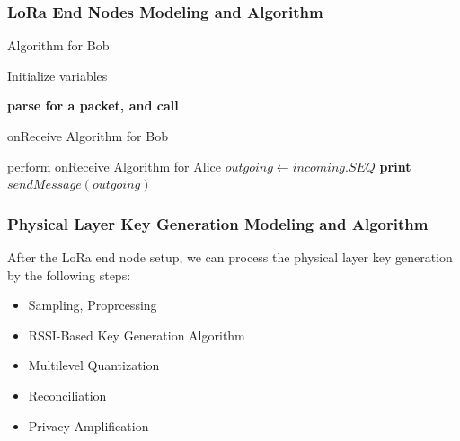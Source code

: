 \documentclass{beamer}
\begin{document}
\begin{frame}
  \frametitle{LoRa End Nodes Modeling and Algorithm}
  \begin{algorithm}[H]
    \caption{Algorithm for Bob}\label{alg:Bob}
    \begin{algorithmic}
    \State Initialize variables
        
            \State \textbf{parse for a packet, and call} 
        \EndFunction
    \end{algorithmic}
  \end{algorithm}
  \begin{algorithm}[H]
    \caption{onReceive Algorithm for Bob}\label{alg:BobonReceive}
    \begin{algorithmic}
            \State perform onReceive Algorithm for Alice
            \State $outgoing \gets incoming.SEQ$
            \State \textbf{print} $sendMessage(outgoing)$
        \EndFunction
    \end{algorithmic}
  \end{algorithm}
\end{frame}

\begin{frame}
  \frametitle{Physical Layer Key Generation Modeling and Algorithm}
  After the LoRa end node setup, we can process the physical layer key generation by the following steps:
  \begin{itemize}
    \item Sampling, Proprcessing
    \item RSSI-Based Key Generation Algorithm
    \item Multilevel Quantization
    \item Reconciliation
    \item Privacy Amplification
  \end{itemize}
\end{frame}
\end{document}
